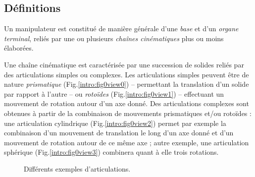 \subsection{Définitions} \label{chap0-0-0}

Un manipulateur est constitué de manière générale d'une {\it base} et d'un 
{\it organe terminal}, reliés par une ou plusieurs {\it chaînes cinématiques} 
plus ou moins élaborées.

Une chaîne cinématique est caractérisée par une succession de solides reliés 
par des articulations simples ou complexes. Les articulations simples peuvent 
être de nature {\it prismatique} (Fig.\ref{intro:fig0view0}) -- permettant la 
translation d'un solide par rapport à l'autre -- ou {\it rotoïdes} 
(Fig.\ref{intro:fig0view1}) -- effectuant un mouvement de rotation autour d'un 
axe donné. Des articulations complexes sont obtenues à partir de la combinaison 
de mouvements prismatiques et/ou rotoïdes : une articulation cylindrique 
(Fig.\ref{intro:fig0view2}) permet par exemple la combinaison d'un mouvement de 
translation le long d'un axe donné et d'un mouvement de rotation autour de ce 
même axe ; autre exemple, une articulation sphérique 
(Fig.\ref{intro:fig0view3}) combinera quant à elle trois rotations.

\begin{figure}[!ht]
  \centering
\hfill
\hfill
\hfill
    \caption{\footnotesize{Différents exemples d'articulations.}}
\label{intro:fig0}
\end{figure}

